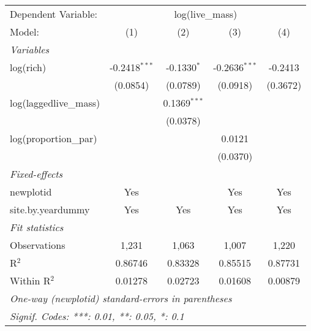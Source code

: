 \begin{tabular}{lcccc}
\tabularnewline\midrule\midrule
Dependent Variable:&\multicolumn{4}{c}{log(live\_mass)}\\
Model:&(1) & (2) & (3) & (4)\\
\midrule \emph{Variables}&   &   &   &  \\
log(rich)&-0.2418$^{***}$ & -0.1330$^{*}$ & -0.2636$^{***}$ & -0.2413\\
  &(0.0854) & (0.0789) & (0.0918) & (0.3672)\\
log(laggedlive\_mass)&   & 0.1369$^{***}$ &    &   \\
  &   & (0.0378) &    &   \\
log(proportion\_par)&   &    & 0.0121 &   \\
  &   &    & (0.0370) &   \\
\midrule \emph{Fixed-effects}&   &   &   &  \\
newplotid & Yes &  & Yes & Yes\\
site.by.yeardummy & Yes & Yes & Yes & Yes\\
\midrule \emph{Fit statistics}&  & & & \\
Observations & 1,231&1,063&1,007&1,220\\
R$^2$ & 0.86746&0.83328&0.85515&0.87731\\
Within R$^2$ & 0.01278&0.02723&0.01608&0.00879\\
\midrule\midrule\multicolumn{5}{l}{\emph{One-way (newplotid) standard-errors in parentheses}}\\
\multicolumn{5}{l}{\emph{Signif. Codes: ***: 0.01, **: 0.05, *: 0.1}}\\
\end{tabular}


